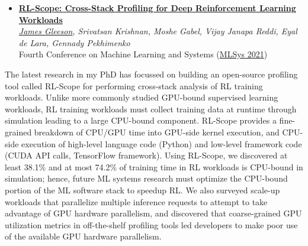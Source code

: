 \documentclass[letterpaper,11pt]{article}
\begin{document}
\begin{itemize}[leftmargin=*]
\item 
    \noindent
        \textbf{\href{https://arxiv.org/abs/2102.04285}{RL-Scope: Cross-Stack Profiling for Deep Reinforcement Learning Workloads}} \\
    \noindent
        \textit{\underline{James Gleeson}, Srivatsan Krishnan, Moshe Gabel, Vijay Janapa Reddi, Eyal de Lara, Gennady Pekhimenko} \\
    \noindent
    Fourth Conference on Machine Learning and Systems (\href{https://mlsys.org/Conferences/2021}{MLSys 2021})
\end{itemize}
\vspace{-1em}
%
The latest research in my PhD has focussed on building an open-source profiling tool called RL-Scope for 
performing cross-stack analysis of RL training workloads.  
Unlike more commonly studied GPU-bound supervised learning workloads, RL training workloads must collect training data at runtime through simulation leading to a large CPU-bound component.
RL-Scope provides a fine-grained breakdown of CPU/GPU time into GPU-side kernel execution, and CPU-side execution of high-level language code (Python) and low-level framework code (CUDA API calls, TensorFlow framework).
Using RL-Scope, we discovered at least 38.1\% and at most 74.2\% of training time in RL workloads is CPU-bound in simulation; hence, future ML systems research must optimize the CPU-bound portion of the ML software stack to speedup RL.
We also surveyed scale-up workloads that parallelize multiple inference requests to attempt to take advantage of GPU hardware parallelism, and discovered that coarse-grained GPU utilization metrics in off-the-shelf profiling tools led developers to make poor use of the available GPU hardware parallelism.
\end{document}
